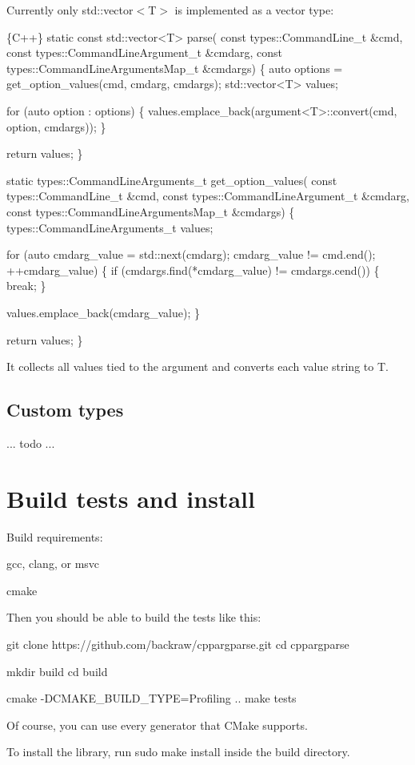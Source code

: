 Currently only {\ttfamily std\+::vector$<$T$>$} is implemented as a vector type\+: 
\begin{DoxyCode}
\{C++\}
static const std::vector<T> parse(
        const types::CommandLine\_t &cmd,
        const types::CommandLineArgument\_t &cmdarg,
        const types::CommandLineArgumentsMap\_t &cmdargs)
\{
    auto options = get\_option\_values(cmd, cmdarg, cmdargs);
    std::vector<T> values;

    for (auto option : options)
    \{
        values.emplace\_back(argument<T>::convert(cmd, option, cmdargs));
    \}

    return values;
\}


static types::CommandLineArguments\_t get\_option\_values(
        const types::CommandLine\_t &cmd,
        const types::CommandLineArgument\_t &cmdarg,
        const types::CommandLineArgumentsMap\_t &cmdargs)
\{
    types::CommandLineArguments\_t values;

    for (auto cmdarg\_value = std::next(cmdarg); cmdarg\_value != cmd.end(); ++cmdarg\_value)
    \{
        if (cmdargs.find(*cmdarg\_value) != cmdargs.cend())
        \{
            break;
        \}

        values.emplace\_back(cmdarg\_value);
    \}

    return values;
\}
\end{DoxyCode}


It collects all values tied to the argument and converts each value string to {\ttfamily T}.

\subsection*{Custom types}

... todo ...

\section*{Build tests and install}

Build requirements\+:
\begin{DoxyItemize}
\item {\ttfamily gcc}, {\ttfamily clang}, or {\ttfamily msvc}
\item {\ttfamily cmake}
\end{DoxyItemize}

Then you should be able to build the tests like this\+: 
\begin{DoxyCode}
git clone https://github.com/backraw/cppargparse.git
cd cppargparse

mkdir build
cd build

cmake -DCMAKE\_BUILD\_TYPE=Profiling ..
make tests
\end{DoxyCode}


Of course, you can use every generator that C\+Make supports.

To install the library, run {\ttfamily sudo make install} inside the build directory. 